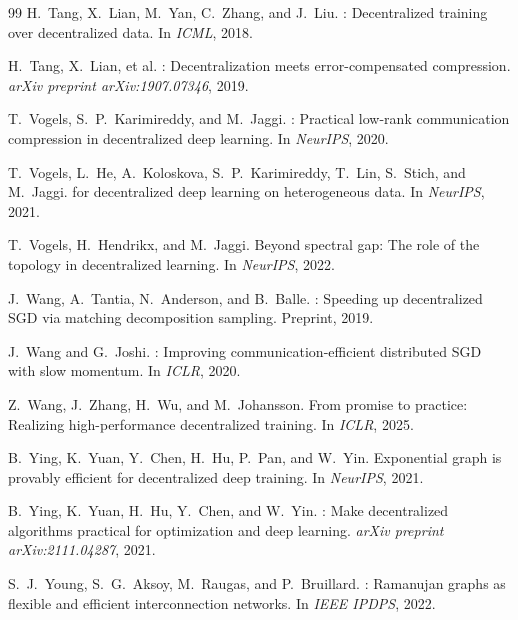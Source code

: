 \documentclass{article}
\begin{document}
\begin{thebibliography}{99}
H.~Tang, X.~Lian, M.~Yan, C.~Zhang, and J.~Liu.
: Decentralized training over decentralized data.
\newblock In \emph{ICML}, 2018.

H.~Tang, X.~Lian, et al.
: Decentralization meets error-compensated compression.
\newblock \emph{arXiv preprint arXiv:1907.07346}, 2019.

T.~Vogels, S.~P.~Karimireddy, and M.~Jaggi.
: Practical low-rank communication compression in decentralized deep learning.
\newblock In \emph{NeurIPS}, 2020.

T.~Vogels, L.~He, A.~Koloskova, S.~P.~Karimireddy, T.~Lin, S.~Stich, and M.~Jaggi.
 for decentralized deep learning on heterogeneous data.
\newblock In \emph{NeurIPS}, 2021.

T.~Vogels, H.~Hendrikx, and M.~Jaggi.
\newblock Beyond spectral gap: The role of the topology in decentralized learning.
\newblock In \emph{NeurIPS}, 2022.

J.~Wang, A.~Tantia, N.~Anderson, and B.~Balle.
: Speeding up decentralized {SGD} via matching decomposition sampling.
\newblock Preprint, 2019.

J.~Wang and G.~Joshi.
: Improving communication-efficient distributed {SGD} with slow momentum.
\newblock In \emph{ICLR}, 2020.

Z.~Wang, J.~Zhang, H.~Wu, and M.~Johansson.
\newblock From promise to practice: Realizing high-performance decentralized training.
\newblock In \emph{ICLR}, 2025.

B.~Ying, K.~Yuan, Y.~Chen, H.~Hu, P.~Pan, and W.~Yin.
\newblock Exponential graph is provably efficient for decentralized deep training.
\newblock In \emph{NeurIPS}, 2021.

B.~Ying, K.~Yuan, H.~Hu, Y.~Chen, and W.~Yin.
: Make decentralized algorithms practical for optimization and deep learning.
\newblock \emph{arXiv preprint arXiv:2111.04287}, 2021.

S.~J.~Young, S.~G.~Aksoy, M.~Raugas, and P.~Bruillard.
: {R}amanujan graphs as flexible and efficient interconnection networks.
\newblock In \emph{IEEE IPDPS}, 2022.


\end{thebibliography}
\end{document}
